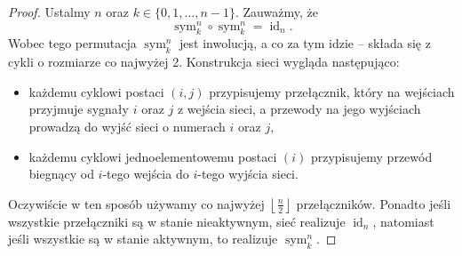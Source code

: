 \documentclass[a4paper]{article}
\newcommand{\sym}[2]{\operatorname{sym}_{#2}^{#1}}
\newcommand{\id}[1]{\operatorname{id}_{#1}}
\newcommand{\td}{\text{.}}
\newcommand{\floor}[1]{\left\lfloor #1 \right\rfloor}
\theoremstyle{definition}
\begin{document}
\begin{proof}
    Ustalmy \(n\) oraz \(k \in \{0, 1, \ldots, n-1\}\). Zauważmy, że 
    \[
    \sym{n}{k} \circ \sym{n}{k} = \id{n} \td
    \]
    Wobec tego permutacja \(\sym n k\) jest inwolucją, a co za tym idzie -- składa się z cykli o rozmiarze co najwyżej 2. Konstrukcja sieci wygląda następująco:
    \begin{itemize}
        \item każdemu cyklowi postaci \((i,j)\) przypisujemy przełącznik, który na wejściach przyjmuje sygnały \(i\) oraz \(j\) z wejścia sieci, a przewody na jego wyjściach prowadzą do wyjść sieci o numerach \(i\) oraz \(j\),
        \item każdemu cyklowi jednoelementowemu postaci \((i)\) przypisujemy przewód biegnący od \(i\)-tego wejścia do \(i\)-tego wyjścia sieci.
    \end{itemize}
    Oczywiście w ten sposób używamy co najwyżej \(\floor{\frac{n}{2}}\) przełączników. 
    Ponadto jeśli wszystkie przełączniki są w stanie nieaktywnym, sieć realizuje \(\id n\), natomiast jeśli wszystkie są w stanie aktywnym, to realizuje \(\sym n k\).
\end{proof}
\end{document}
